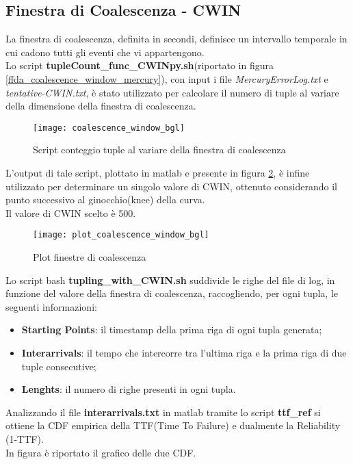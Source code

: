 \subsection{Finestra di Coalescenza - CWIN}
La finestra di coalescenza, definita in secondi, definisce un intervallo temporale
in cui cadono tutti gli eventi che vi appartengono.\\
Lo script \textbf{tupleCount\_func\_CWINpy.sh}(riportato in figura \ref{ffda_coalescence_window_mercury}), con input i file \textit{MercuryErrorLog.txt}
e \textit{tentative-CWIN.txt}, è stato utilizzato per calcolare il numero di tuple al
variare della dimensione della finestra di coalescenza.\\

\begin{figure}[!htbp]
  \centering
  \texttt{[image: coalescence\_window\_bgl]}
  \caption{Script conteggio tuple al variare della finestra di coalescenza}
  \label{ffda_coalescence_window_bgl}
\end{figure}

L'output di tale script, plottato in matlab e presente in figura \ref{ffda_plot_coalescence_window_bgl},
è infine utilizzato per determinare un singolo valore di CWIN, ottenuto
considerando il punto successivo al ginocchio(knee) della curva.\\
Il valore di CWIN scelto è 500.\\
\begin{figure}[!htbp]
  \texttt{[image: plot\_coalescence\_window\_bgl]}
  \caption{Plot finestre di coalescenza}
  \label{ffda_plot_coalescence_window_bgl}
\end{figure}

Lo script bash \textbf{tupling\_with\_CWIN.sh} suddivide le righe del file di log,
in funzione del valore della finestra di coalescenza, raccogliendo, per ogni tupla,
le seguenti informazioni:

\begin{itemize}
  \item \textbf{Starting Points}: il timestamp della prima riga di ogni tupla generata;
  \item \textbf{Interarrivals}: il tempo che intercorre tra l'ultima riga e la
  prima riga di due tuple consecutive;
  \item \textbf{Lenghts}: il numero di righe presenti in ogni tupla.
\end{itemize}

Analizzando il file \textbf{interarrivals.txt} in matlab tramite lo script \textbf{ttf\_ref}
si ottiene la CDF empirica della TTF(Time To Failure) e dualmente la Reliability (1-TTF).\\
In figura è riportato il grafico delle due CDF.

